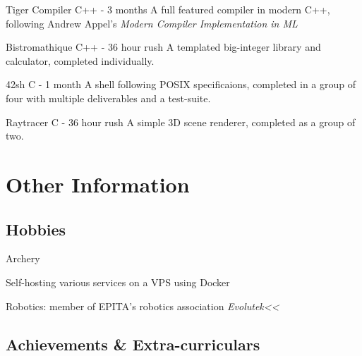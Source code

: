 \documentclass[letterpaper]{twentysecondcv} %
\begin{document}
\begin{twenty}

    {Tiger Compiler}
    {C++ - 3 months}
    {A full featured compiler in modern C++, following Andrew Appel's
    \textit{Modern Compiler Implementation in ML}}

    {Bistromathique}
    {C++ - 36 hour rush}
    {A templated big-integer library and calculator, completed individually.}

    {42sh}
    {C - 1 month}
    {A shell following POSIX specificaions, completed in a group of four
    with multiple deliverables and a test-suite.}

    {Raytracer}
    {C - 36 hour rush}
    {A simple 3D scene renderer, completed as a group of two.}

\end{twenty}



\section{Other Information}

\subsection{Hobbies}

\begin{twenty}

  \twentyitemshort{}
    {Archery}

  \twentyitemshort{}
    {Self-hosting various services on a VPS using Docker}

  \twentyitemshort{}
    {Robotics: member of EPITA's robotics association \textit{Evolutek<<}}

\end{twenty}

\subsection{Achievements \& Extra-curriculars}
\end{document}
